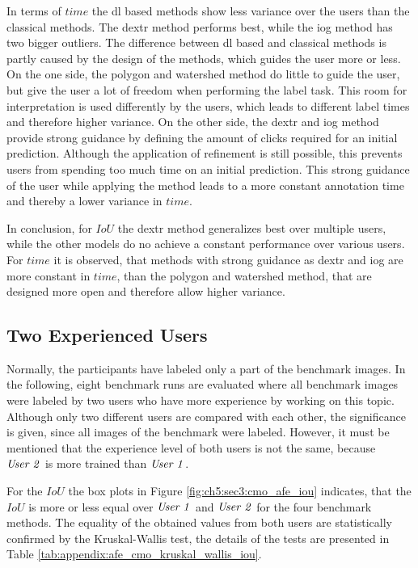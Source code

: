 In terms of $ time $ the \gls{dl} based methods show less variance over the users than the classical methods.
The \gls{dextr} method performs best, while the \gls{iog} method has two bigger outliers.
The difference between \gls{dl} based and classical methods is partly caused by the design of the methods, which guides the user more or less.
On the one side, the polygon and watershed method do little to guide the user,
but give the user a lot of freedom when performing the label task.
This room for interpretation is used differently by the users, which leads to different label times and therefore higher variance.
On the other side, the \gls{dextr} and \gls{iog} method provide strong guidance by defining the amount of clicks required for an initial prediction.
Although the application of refinement is still possible, this prevents users from spending too much time on an initial prediction.
This strong guidance of the user while applying the method leads to a more constant annotation time and thereby a lower variance in $ time $.

In conclusion, for $IoU$ the \gls{dextr} method generalizes best over multiple users, while the other models do no achieve a constant performance over various users.
For $ time $ it is observed, that methods with strong guidance as \gls{dextr} and \gls{iog} are more constant in $ time $, than the polygon and watershed method, that are designed more open and therefore allow higher variance.


\subsection{Two Experienced Users} \label{ord:ch5:sec3:subsec2_cmo_afe}

Normally, the participants have labeled only a part of the benchmark images. 
In the following, eight benchmark runs are evaluated where all benchmark images were labeled by two users who have more experience by working on this topic.
Although only two different users are compared with each other, the significance is given, since all images of the benchmark were labeled.
However, it must be mentioned that the experience level of both users is not the same, because $ \textnormal{\textit{User 2}} $ is more trained than $ \textnormal{\textit{User 1}} $.

For the $ IoU $ the box plots in Figure \ref{fig:ch5:sec3:cmo_afe_iou} indicates, that the $ IoU $ is more or less equal over $ \textnormal{\textit{User 1}} $ and $ \textnormal{\textit{User 2}} $ for the four benchmark methods.
The equality of the obtained values from both users are statistically confirmed by the Kruskal-Wallis test, the details of the tests are presented in Table \ref{tab:appendix:afe_cmo_kruskal_wallis_iou}.

